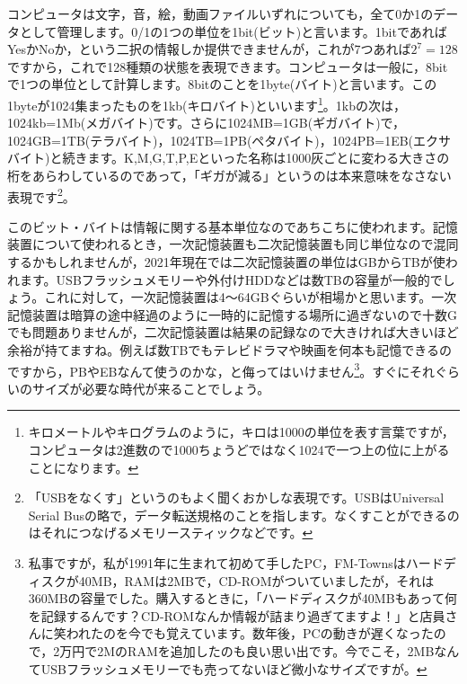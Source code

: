 \documentclass{ltjsbook}
\begin{document}
コンピュータは文字，音，絵，動画ファイルいずれについても，全て0か1のデータとして管理します。0/1の1つの単位を1bit(ビット)と言います。1bitであればYesかNoか，という二択の情報しか提供できませんが，これが7つあれば$2^7=128$ですから，これで128種類の状態を表現できます。コンピュータは一般に，8bitで1つの単位として計算します。8bitのことを1byte(バイト)と言います。この1byteが1024集まったものを1kb(キロバイト)といいます\footnote{キロメートルやキログラムのように，キロは1000の単位を表す言葉ですが，コンピュータは2進数ので1000ちょうどではなく1024で一つ上の位に上がることになります。}。1kbの次は，1024kb=1Mb(メガバイト)です。さらに1024MB=1GB(ギガバイト)で，1024GB=1TB(テラバイト)，1024TB=1PB(ペタバイト)，1024PB=1EB(エクサバイト)と続きます。K,M,G,T,P,Eといった名称は1000灰ごとに変わる大きさの桁をあらわしているのであって，「ギガが減る」というのは本来意味をなさない表現です\footnote{「USBをなくす」というのもよく聞くおかしな表現です。USBはUniversal Serial Busの略で，データ転送規格のことを指します。なくすことができるのはそれにつなげるメモリースティックなどです。}。

このビット・バイトは情報に関する基本単位なのであちこちに使われます。記憶装置について使われるとき，一次記憶装置も二次記憶装置も同じ単位なので混同するかもしれませんが，2021年現在では二次記憶装置の単位はGBからTBが使われます。USBフラッシュメモリーや外付けHDDなどは数TBの容量が一般的でしょう。これに対して，一次記憶装置は4〜64GBぐらいが相場かと思います。一次記憶装置は暗算の途中経過のように一時的に記憶する場所に過ぎないので十数Gでも問題ありませんが，二次記憶装置は結果の記録なので大きければ大きいほど余裕が持てますね。例えば数TBでもテレビドラマや映画を何本も記憶できるのですから，PBやEBなんて使うのかな，と侮ってはいけません\footnote{私事ですが，私が1991年に生まれて初めて手したPC，FM-Townsはハードディスクが40MB，RAMは2MBで，CD-ROMがついていましたが，それは360MBの容量でした。購入するときに，「ハードディスクが40MBもあって何を記録するんです？CD-ROMなんか情報が詰まり過ぎてますよ！」と店員さんに笑われたのを今でも覚えています。数年後，PCの動きが遅くなったので，2万円で2MのRAMを追加したのも良い思い出です。今でこそ，2MBなんてUSBフラッシュメモリーでも売ってないほど微小なサイズですが。}。すぐにそれぐらいのサイズが必要な時代が来ることでしょう。
\end{document}
